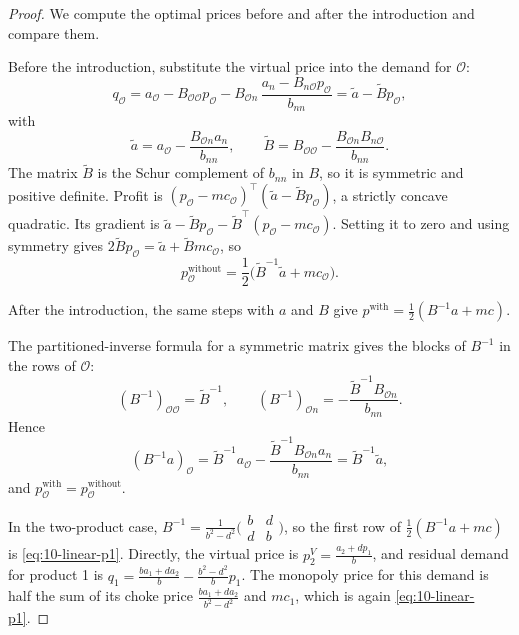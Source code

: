 \begin{proof}
We compute the optimal prices before and after the introduction and compare them.

Before the introduction, substitute the virtual price into the demand for $\mathcal{O}$:
\begin{equation*}
  q_{\mathcal{O}} = a_{\mathcal{O}} - B_{\mathcal{O}\mathcal{O}}p_{\mathcal{O}} - B_{\mathcal{O}n}\,\frac{a_n - B_{n\mathcal{O}}p_{\mathcal{O}}}{b_{nn}}
  = \tilde a - \tilde Bp_{\mathcal{O}},
\end{equation*}
with
\begin{equation*}
  \tilde a = a_{\mathcal{O}} - \frac{B_{\mathcal{O}n}a_n}{b_{nn}}, \qquad
  \tilde B = B_{\mathcal{O}\mathcal{O}} - \frac{B_{\mathcal{O}n}B_{n\mathcal{O}}}{b_{nn}} .
\end{equation*}
The matrix $\tilde B$ is the Schur complement of $b_{nn}$ in $B$, so it is symmetric and positive definite.
Profit is $(p_{\mathcal{O}} - mc_{\mathcal{O}})^\top(\tilde a - \tilde Bp_{\mathcal{O}})$, a strictly concave
quadratic. Its gradient is
$\tilde a - \tilde Bp_{\mathcal{O}} - \tilde B^\top(p_{\mathcal{O}} - mc_{\mathcal{O}})$. Setting it to zero and
using symmetry gives $2\tilde Bp_{\mathcal{O}} = \tilde a + \tilde Bmc_{\mathcal{O}}$, so
\begin{equation*}
  p_{\mathcal{O}}^{\text{without}} = \frac{1}{2}\bigl(\tilde B^{-1}\tilde a + mc_{\mathcal{O}}\bigr).
\end{equation*}

After the introduction, the same steps with $a$ and $B$ give $p^{\text{with}} = \frac{1}{2}(B^{-1}a + mc)$.

The partitioned-inverse formula for a symmetric matrix gives the blocks of $B^{-1}$ in the rows of
$\mathcal{O}$:
\begin{equation*}
  (B^{-1})_{\mathcal{O}\mathcal{O}} = \tilde B^{-1}, \qquad (B^{-1})_{\mathcal{O}n} = -\frac{\tilde B^{-1}B_{\mathcal{O}n}}{b_{nn}} .
\end{equation*}
Hence
\begin{equation*}
  (B^{-1}a)_{\mathcal{O}} = \tilde B^{-1}a_{\mathcal{O}} - \frac{\tilde B^{-1}B_{\mathcal{O}n}a_n}{b_{nn}} = \tilde B^{-1}\tilde a,
\end{equation*}
and $p_{\mathcal{O}}^{\text{with}} = p_{\mathcal{O}}^{\text{without}}$.

In the two-product case, $B^{-1} = \frac{1}{b^2 - d^2}\bigl(\begin{smallmatrix} b & d\\ d & b\end{smallmatrix}\bigr)$,
so the first row of $\frac{1}{2}(B^{-1}a + mc)$ is \eqref{eq:10-linear-p1}. Directly, the virtual price is
$p_2^V = \frac{a_2 + dp_1}{b}$, and residual demand for product 1 is
$q_1 = \frac{ba_1 + da_2}{b} - \frac{b^2 - d^2}{b}p_1$. The monopoly price for this demand is half the sum of
its choke price $\frac{ba_1 + da_2}{b^2 - d^2}$ and $mc_1$, which is again \eqref{eq:10-linear-p1}.
\end{proof}

